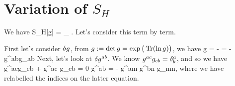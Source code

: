 \section{Variation of $S_H$}

We have 
\bse
    \del S_H[g] = \int_{\cM} .
\ese 
Let's consider this term by term. 

First let's consider $\delta g$, from $g := \det g = \exp\big(\Tr(\ln g)\big)$, we have 
\bse 
    \del g = - = -\cdot g^{ab}\cdot \del g_{ab}
\ese 
Next, let's look at $\delta g^{ab}$. We know $g^{ac}g_{cb} = \delta^a_b$, and so we have
\bse 
    \del g^{ac}\cdot g_{cb} + g^{ac} \cdot \del g_{cb} = 0 \qquad \implies \qquad \del g^{ab} = - g^{am} \cdot g^{bn} \cdot \del g_{mn},
\ese
where we have relabelled the indices on the latter equation.

